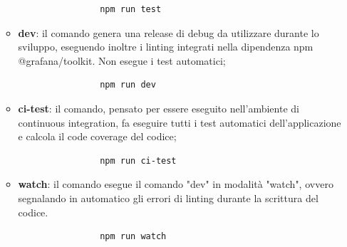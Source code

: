 \begin{itemize}
\begin{itemize}
			\begin{verbatim}
				npm run test
			\end{verbatim}
			\item \textbf{dev}: il comando genera una release di debug da utilizzare durante lo sviluppo, eseguendo inoltre i linting integrati nella dipendenza npm @grafana/toolkit. Non esegue i test automatici;
			\begin{verbatim}
				npm run dev
			\end{verbatim}
			\item \textbf{ci-test}: il comando, pensato per essere eseguito nell'ambiente di continuous integration, fa eseguire tutti i test automatici dell'applicazione e calcola il code coverage del codice;
			\begin{verbatim}
				npm run ci-test
			\end{verbatim}
			\item \textbf{watch}: il comando esegue il comando "dev" in modalità "watch", ovvero segnalando in automatico gli errori di linting durante la scrittura del codice.
			\begin{verbatim}
				npm run watch
			\end{verbatim}
		\end{itemize}
\end{itemize}
